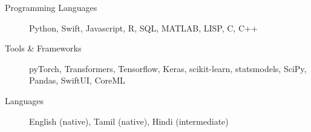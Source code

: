 \begin{description}
\item[Programming Languages] Python, Swift, Javascript, R, SQL, MATLAB, LISP, C, C++

\item[Tools \& Frameworks] pyTorch, Transformers, Tensorflow, Keras, scikit-learn, statsmodels, SciPy, Pandas, SwiftUI, CoreML

\item[Languages] English (native), Tamil (native), Hindi (intermediate)
\end{description}
